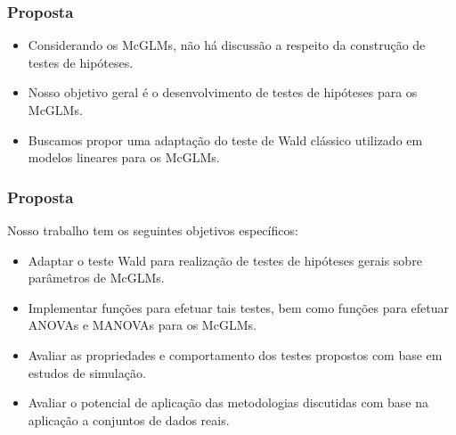 \documentclass[handout,serif, professionalfont, usenames, dvipsnames, aspectratio = 169]{beamer}\usepackage[]{graphicx}\usepackage[]{color}
\begin{document}

\begin{frame}
  \frametitle{Proposta}

  \begin{itemize}
    \itemsep 2ex

  \item Considerando os McGLMs, não há discussão a respeito da construção de testes de hipóteses.
  
  \item Nosso objetivo geral é o desenvolvimento de testes de hipóteses para os McGLMs.

  \item Buscamos propor uma adaptação do teste de Wald clássico utilizado em modelos lineares para os McGLMs. 

  \end{itemize}

\end{frame}


\begin{frame}
  \frametitle{Proposta}

Nosso trabalho tem os seguintes objetivos específicos: 

  \begin{itemize}
    \itemsep 2ex

  \item Adaptar o teste Wald para realização de testes de hipóteses gerais sobre parâmetros de McGLMs. 
  
  \item Implementar funções para efetuar tais testes, bem como funções para efetuar ANOVAs e MANOVAs para os McGLMs. 

  \item Avaliar as propriedades e comportamento dos testes propostos com base em estudos de simulação.

  \item Avaliar o potencial de aplicação das metodologias discutidas com base na aplicação a conjuntos de dados reais.

  \end{itemize}

\end{frame}

\end{document}
